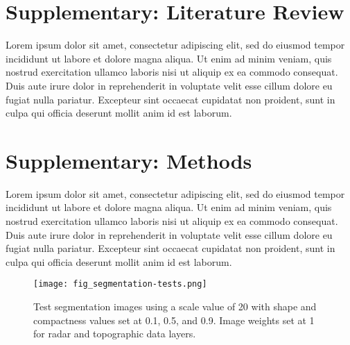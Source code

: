 
\appendix

\begin{appendices}

\chapter{Supplementary: Literature Review}
\label{sup: supplementary-litrev}

Lorem ipsum dolor sit amet, consectetur adipiscing elit, sed do eiusmod tempor incididunt ut labore et dolore magna aliqua. Ut enim ad minim veniam, quis nostrud exercitation ullamco laboris nisi ut aliquip ex ea commodo consequat. Duis aute irure dolor in reprehenderit in voluptate velit esse cillum dolore eu fugiat nulla pariatur. Excepteur sint occaecat cupidatat non proident, sunt in culpa qui officia deserunt mollit anim id est laborum.


\chapter{Supplementary: Methods}
\label{sup: supplementary-methods}

Lorem ipsum dolor sit amet, consectetur adipiscing elit, sed do eiusmod tempor incididunt ut labore et dolore magna aliqua. Ut enim ad minim veniam, quis nostrud exercitation ullamco laboris nisi ut aliquip ex ea commodo consequat. Duis aute irure dolor in reprehenderit in voluptate velit esse cillum dolore eu fugiat nulla pariatur. Excepteur sint occaecat cupidatat non proident, sunt in culpa qui officia deserunt mollit anim id est laborum.


\begin{figure}
	\centering
	\texttt{[image: fig\_segmentation-tests.png]}
	\caption[Images of segmentation tests.]{Test segmentation images using a scale value of 20 with shape and compactness values set at 0.1, 0.5, and 0.9. Image weights set at 1 for radar and topographic data layers.}
	\label{fig: appendix-fig.b1}
\end{figure}


\end{appendices}
